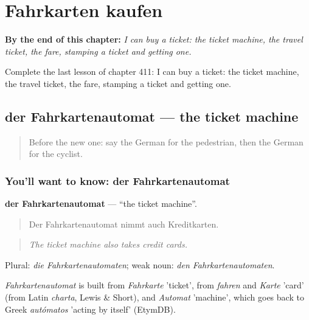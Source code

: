 
\chapter{Fahrkarten kaufen}
\label{ch:ge-fahrkarten-kaufen}

\begin{chapteropening}
\textbf{By the end of this chapter:} \emph{I can buy a ticket: the ticket machine, the travel ticket, the fare, stamping a ticket and getting one.}

Complete the last lesson of chapter 411: I can buy a ticket: the ticket machine, the travel ticket, the fare, stamping a ticket and getting one.
\end{chapteropening}

\section[der Fahrkartenautomat]{der Fahrkartenautomat — the ticket machine}

\label{lesson:GE-C411-fahrkartenautomat}



\begin{quote}
Before the new one: say the German for the pedestrian, then the German for the cyclist.
\end{quote}

\subsection*{You'll want to know: der Fahrkartenautomat}
\textbf{der Fahrkartenautomat} — \textquotedblleft{}the ticket machine\textquotedblright{}.

\begin{quote}
Der Fahrkartenautomat nimmt auch Kreditkarten.
\end{quote}

\begin{quote}
\emph{The ticket machine also takes credit cards.}
\end{quote}

Plural: \emph{die Fahrkartenautomaten}; weak noun: \emph{den Fahrkartenautomaten}.

\begin{cousinweb}
\emph{Fahrkartenautomat} is built from \emph{Fahrkarte} 'ticket', from \emph{fahren} and \emph{Karte} 'card' (from Latin \emph{charta}, Lewis \& Short), and \emph{Automat} 'machine', which goes back to Greek \emph{autómatos} 'acting by itself' (EtymDB).
\end{cousinweb}


